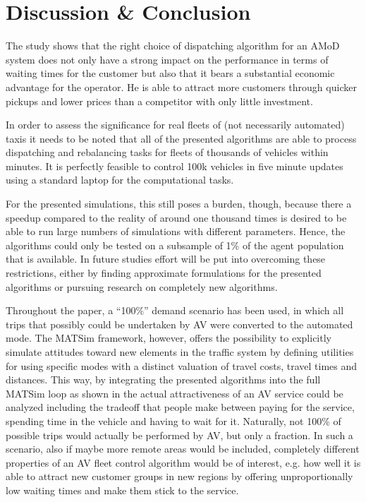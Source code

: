 \section{Discussion \& Conclusion}
\label{sec:Conclusion}

The study shows that the right choice of dispatching algorithm for an AMoD system does not only have a strong impact on the performance in terms of waiting times for the customer but also that it bears a substantial economic advantage for the
operator. He is able to attract more customers through quicker pickups and lower prices than a competitor with only little investment.

In order to assess the significance for real fleets of (not necessarily
automated) taxis it needs to be noted that all of the presented algorithms are able to process dispatching and rebalancing tasks for fleets of thousands of vehicles within minutes. It is perfectly feasible to control 100k vehicles in five minute updates using a standard laptop for the computational tasks.

For the presented simulations, this still poses a burden, though,  because there a speedup compared to the reality of around one thousand times is desired to be able to run large numbers of simulations with different parameters. Hence, the algorithms
could only be tested on a subsample of 1\% of the agent population that is available. In future studies effort will be put into overcoming these restrictions, either by finding approximate formulations for the presented algorithms or pursuing research on completely new algorithms.

Throughout the paper, a ``100\%'' demand scenario has been used, in which all trips that possibly could be undertaken by AV were converted to the automated mode. The MATSim framework, however, offers the possibility to explicitly simulate attitudes toward new elements in the traffic system by defining utilities for using specific modes with a distinct valuation of travel costs, travel times and distances. This way, by integrating the presented algorithms into the full MATSim loop as shown in \cite{horl_abmtrans17} the actual attractiveness of an AV service could be analyzed including the tradeoff that people make between paying for the service, spending time in the vehicle and having to wait for it.
Naturally, not 100\% of possible trips would actually be performed by AV, but only a fraction. In such a scenario, also if maybe more remote areas would be included, completely different properties of an AV fleet control algorithm would be of interest, e.g. how well it is able to attract new customer groups in new regions by offering unproportionally low waiting times and make them stick to the service.
